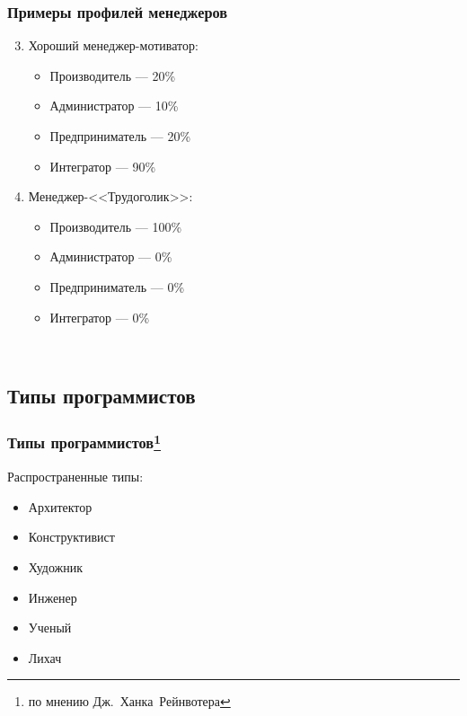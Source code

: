 \documentclass{../industrial-development}
\begin{document}
{\begin{frame} \frametitle{Примеры профилей менеджеров }
	\begin{enumerate}
\setcounter{enumi}{2}
\item Хороший менеджер-мотиватор:
		 \begin{itemize}
                     \item Производитель — 20\%
 		 \item Администратор — 10\%
 		 \item Предприниматель — 20\%
		\item Интегратор — 90\%
		\end{itemize} 
\item Менеджер-<<Трудоголик>>:	
		 \begin{itemize}
                         \item Производитель — 100\%
 		 \item Администратор — 0\%
 		 \item Предприниматель — 0\%
		\item Интегратор — 0\%
		\end{itemize} 
\end{enumerate}
\end{frame}
\lecturenotes
~\cite{How_to_be_a_good_IT-manager}

\subsection{Типы программистов}
\begin{frame} \frametitle{Типы программистов\footnote[1]{по мнению Дж.~Ханка~Рейнвотера}}
	\begin{block}{Распространенные типы:}
\begin{itemize}
\item Архитектор
\item Конструктивист 
\item Художник
\item Инженер
\item Ученый
\item Лихач
\end{itemize}
\end{block}
\end{frame}
\lecturenotes

}
\end{document}
